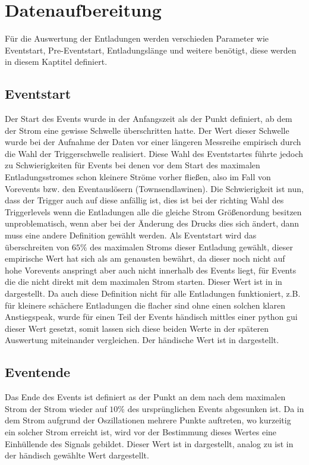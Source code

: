 \chapter{Datenaufbereitung}
\label{chap:features}

Für die Auswertung der Entladungen werden verschieden Parameter wie Eventstart, Pre-Eventstart, Entladungslänge und weitere benötigt, diese werden in diesem Kaptitel definiert.

\section{Eventstart}
\label{sec:eventstart}

Der Start des Events wurde in der Anfangszeit als der Punkt definiert, ab dem der Strom eine gewisse Schwelle überschritten hatte. Der Wert dieser Schwelle wurde bei der Aufnahme der Daten vor einer längeren Messreihe empirisch durch die Wahl der Triggerschwelle realisiert. Diese Wahl des Eventstartes führte jedoch zu Schwierigkeiten für Events bei denen vor dem Start des maximalen Entladungsstromes schon kleinere Ströme vorher fließen, also im Fall von Vorevents bzw. den Eventauslösern (Townsendlawinen). Die Schwierigkeit ist nun, dass der Trigger auch auf diese anfällig ist, dies ist bei der richting Wahl des Triggerlevels wenn die Entladungen alle die gleiche Strom Größenordung besitzen unproblematisch, wenn aber bei der Änderung des Drucks dies sich ändert, dann muss eine andere Definition gewählt werden. Als Eventstart wird das überschreiten von $65 \%$ des maximalen Stroms dieser Entladung gewählt, dieser empirische Wert hat sich als am genausten bewährt, da dieser noch nicht auf hohe Vorevents anspringt aber auch nicht innerhalb des Events liegt, für Events die die nicht direkt mit dem maximalen Strom starten. Dieser Wert ist in in  dargestellt. Da auch diese Definition nicht für alle Entladungen funktioniert, z.B. für kleinere schächere Entladungen die flacher sind ohne einen solchen klaren Anstiegspeak, wurde für einen Teil der Events händisch mittles einer python gui dieser Wert gesetzt, somit lassen sich diese beiden Werte in der späteren Auswertung miteinander vergleichen. Der händische Wert ist in  dargestellt.

\section{Eventende}
\label{sec:eventende}
Das Ende des Events ist definiert as der Punkt an dem nach dem maximalen Strom der Strom wieder auf \(10\%\) des ursprünglichen Events abgesunken ist. Da in dem Strom aufgrund der Oszillationen mehrere Punkte auftreten, wo kurzeitig ein solcher Strom erreicht ist, wird vor der Bestimmung dieses Wertes eine Einhüllende des Signals gebildet. Dieser Wert ist in  dargestellt, analog zu  ist in  der händisch gewählte Wert dargestellt.

